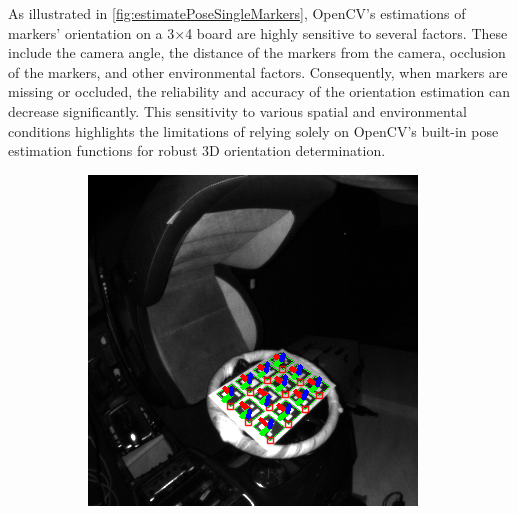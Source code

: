 As illustrated in \cref{fig:estimatePoseSingleMarkers}, 
OpenCV's estimations of markers' orientation on a 3×4 board are highly sensitive to several factors. 
These include the camera angle, the distance of the markers from 
the camera, occlusion of the markers, and other environmental 
factors. Consequently, when markers are missing or occluded, 
the reliability and accuracy of the orientation estimation can 
decrease significantly. This sensitivity to various spatial and 
environmental conditions highlights the limitations of relying 
solely on OpenCV's built-in pose estimation functions for robust 
3D orientation determination.

\begin{figure}[htpb]
    \centering
    \begin{subfigure}[t]{0.23\textwidth}
        \centering
        \includegraphics[width=\textwidth]{media/chapter 5/aruco_board_estimation0.png}
    \end{subfigure}\hfill
    \begin{subfigure}[t]{0.23\textwidth}
        \centering

\end{subfigure}
\end{figure}
